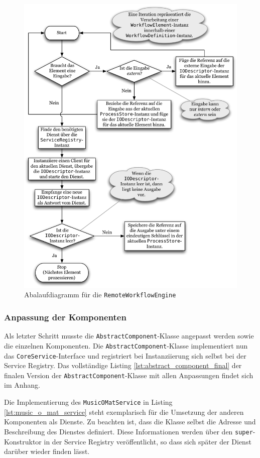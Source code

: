   \begin{figure}[!ht]
    \centering
      \includegraphics[width=.7\textwidth]{images/WorkflowEngine_Flowchart.pdf}
    \caption{Abalaufdiagramm für die \texttt{RemoteWorkflowEngine}}
    \label{fig:images_WorkflowEngine_Flowchart}
  \end{figure}


\subsubsection{Anpassung der Komponenten} %
\label{ssub:anpassung_der_komponenten}

  Als letzter Schritt musste die \verb!AbstractComponent!-Klasse angepasst werden sowie die einzelnen Komponenten. Die \verb!AbstractComponent!-Klasse implementiert nun das \verb!CoreService!-Interface und registriert bei Instanziierung sich selbst bei der Service Registry. Das vollständige Listing \ref{lst:abstract_component_final} der finalen Version der \verb!AbstractComponent!-Klasse mit allen Anpassungen findet sich im Anhang.
  
  Die Implementierung des \verb!MusicOMatService! in Listing \ref{lst:music_o_mat_service} steht exemplarisch für die Umsetzung der anderen Komponenten als Dienste. Zu beachten ist, dass die Klasse selbst die Adresse und Beschreibung des Dienstes definiert. Diese Informationen werden über den \verb!super!-Konstruktor in der Service Registry veröffentlicht, so dass sich später der Dienst darüber wieder finden lässt.


